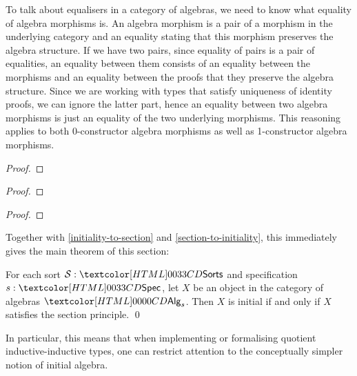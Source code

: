 To talk about equalisers in a category of algebras, we need to know
what equality of algebra morphisms is. An algebra morphism is a pair
of a morphism in the underlying category and an equality stating that
this morphism preserves the algebra structure. If we have two pairs,
since equality of pairs is a pair of equalities, an equality between
them consists of an equality between the morphisms and an equality
between the proofs that they preserve the algebra structure. Since we
are working with types that satisfy uniqueness of identity proofs, we
can ignore the latter part, hence an equality between two algebra
morphisms is just an equality of the two underlying morphisms. This
reasoning applies to both 0-constructor algebra morphisms as well as
1-constructor algebra morphisms.

\begin{lemma}
  
\end{lemma}

\begin{proof}
  
\end{proof}

\begin{proof}
  
\end{proof}

\begin{lemma}
  
\end{lemma}

\begin{proof}
  
\end{proof}

Together with \cref{initiality-to-section} and
\cref{section-to-initiality}, this immediately gives the main theorem
of this section:

\begin{theorem}
\label{thm:main}
  For each sort $\Ss : \sortsty$ and specification $s : \specty$, let $X$
  be an object in the category of algebras $\Alg_s$. Then $X$ is
  initial if and only if $X$ satisfies the section principle. \qed
\end{theorem}

In particular, this means that when implementing or formalising
quotient inductive-inductive types, one can restrict attention to the
conceptually simpler notion of initial algebra.

